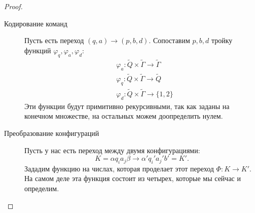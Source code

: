 \begin{proof}
\begin{description}
\begin{description}
		\item [Кодирование команд]
			Пусть есть переход $ (q, a) \to (p, b, d)$. Сопоставим $ p, b, d$ тройку функций $ \varphi _{q}, \varphi _{a}, \varphi _{d}$:
			\[
			\begin{aligned}
				&\varphi _a \colon \widetilde{ Q} \times \widetilde{ \Gamma  }  \to \widetilde{ \Gamma } \\
				& \varphi _{q} \colon \widetilde{ Q} \times \widetilde{ \Gamma }  \to  \widetilde{ Q} \\
				& \varphi _{d} \colon \widetilde{ Q} \times \widetilde{ \Gamma } \to \{1, 2\}
			\end{aligned}
			\]
			Эти функции будут примитивно рекурсивными, так как заданы на конечном множестве, на остальных можем доопределить нулем.
		\item[Преобразование конфигураций]
			Пусть у нас есть переход между двумя конфигурациями: 
			$$ K = \alpha q_i a_j \beta  \to \alpha ' q_i' a_j' b' = K'.$$
			Зададим функцию на числах, которая проделает этот переход $ \Phi \colon K \to  K'$. На самом деле эта функция состоит из четырех, которые мы сейчас и определим.


\end{description}
\end{description}
\end{proof}
